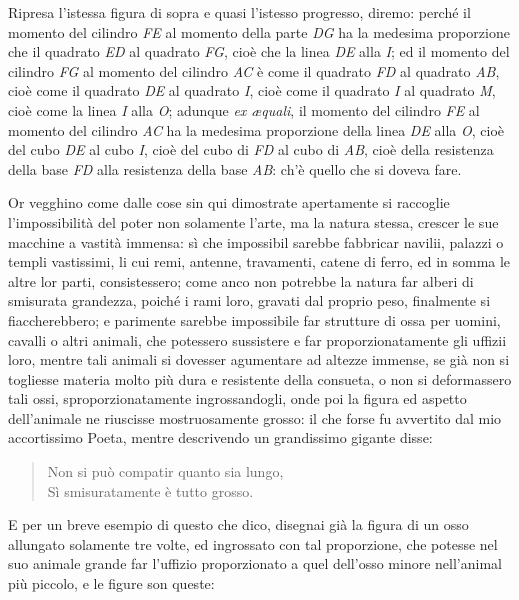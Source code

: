 \documentclass[11pt,twoside,openany]{book}
\newenvironment{enunciato}{%
  \begin{quote}\itshape%
}{%
  \end{quote}%
}
\begin{document}
Ripresa l'istessa figura di sopra e quasi l'istesso progresso, diremo: perché il momento del cilindro \emph{FE} al momento della parte \emph{DG} ha la medesima proporzione che il quadrato \emph{ED} al quadrato \emph{FG}, cioè che la linea \emph{DE} alla \emph{I}; ed il momento del cilindro \emph{FG} al momento del cilindro \emph{AC} è come il quadrato \emph{FD} al quadrato \emph{AB}, cioè come il quadrato \emph{DE} al quadrato \emph{I}, cioè come il quadrato \emph{I} al quadrato \emph{M}, cioè come la linea \emph{I} alla \emph{O}; adunque \emph{ex æquali}, il momento del cilindro \emph{FE} al momento del cilindro \emph{AC} ha la medesima proporzione della linea \emph{DE} alla \emph{O}, cioè del cubo \emph{DE} al cubo \emph{I}, cioè del cubo di \emph{FD} al cubo di \emph{AB}, cioè della resistenza della base \emph{FD} alla resistenza della base \emph{AB}: ch'è quello che si doveva fare.

Or vegghino come dalle cose sin qui dimostrate apertamente si raccoglie l'impossibilità del poter non solamente l'arte, ma la natura stessa, crescer le sue macchine a vastità immensa: sì che impossibil sarebbe fabbricar navilii, palazzi o templi vastissimi, li cui remi, antenne, travamenti, catene di ferro, ed in somma le altre lor parti, consistessero; come anco non potrebbe la natura far alberi di smisurata grandezza, poiché i rami loro, gravati dal proprio peso, finalmente si fiaccherebbero; e parimente sarebbe impossibile far strutture di ossa per uomini, cavalli o altri animali, che potessero sussistere e far proporzionatamente gli uffizii loro, mentre tali animali si dovesser agumentare ad altezze immense, se già non si togliesse materia molto più dura e resistente della consueta, o non si deformassero tali ossi, sproporzionatamente ingrossandogli, onde poi la figura ed aspetto dell'animale ne riuscisse mostruosamente grosso: il che forse fu avvertito dal mio accortissimo Poeta, mentre descrivendo un grandissimo gigante disse:


\begin{enunciato}
Non si può compatir quanto sia lungo, \\ Sì smisuratamente è tutto grosso.
\end{enunciato}

E per un breve esempio di questo che dico, disegnai già la figura di un osso allungato solamente tre volte, ed ingrossato con tal proporzione, che potesse nel suo animale grande far l'uffizio proporzionato a quel dell'osso minore nell'animal più piccolo, e le figure son queste:
\end{document}
